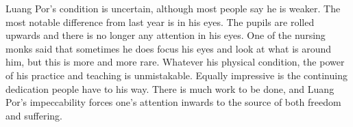 Luang Por's condition is uncertain, although most people say he is
weaker. The most notable difference from last year is in his eyes. The
pupils are rolled upwards and there is no longer any attention in his
eyes. One of the nursing monks said that sometimes he does focus his
eyes and look at what is around him, but this is more and more rare. 
Whatever his physical condition, the power of his practice and teaching
is unmistakable. Equally impressive is the continuing dedication people
have to his way. There is much work to be done, and Luang Por's
impeccability forces one's attention inwards to the source of both
freedom and suffering. 

